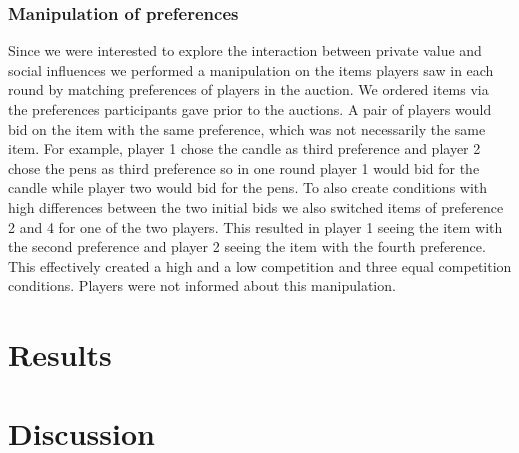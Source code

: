 \documentclass [man]{apa6}
\begin{document}
\subsubsection{Manipulation of preferences} Since we were interested to explore the interaction between private value and social influences we performed a manipulation on the items players saw in each round by matching preferences of players in the auction. We ordered items via the preferences participants gave prior to the auctions. A pair of players would bid on the item with the same preference, which was not necessarily the same item. For example, player 1 chose the candle as third preference and player 2 chose the pens as third preference so in one round player 1 would bid for the candle while player two would bid for the pens. To also create conditions with high differences between the two initial bids we also switched items of preference 2 and 4 for one of the two players. This resulted in player 1 seeing the item with the second preference and player 2 seeing the item with the fourth preference. This effectively created a high and a low competition and three equal competition conditions. Players were not informed about this manipulation.
 

\section{Results}



\section{Discussion}



{}

\end{document}
